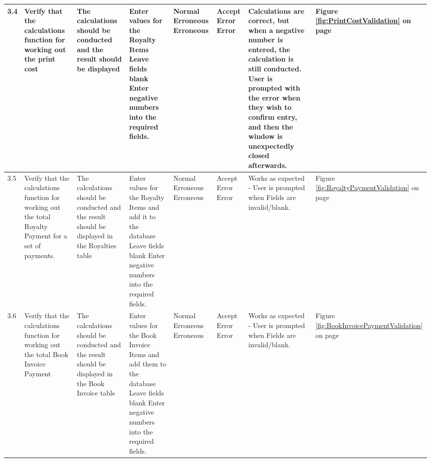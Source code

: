 \begin{landscape}
\begin{center}
\begin{longtable}{|p{1.5cm}|p{2cm}|p{2.5cm}|p{2.5cm}|p{2cm}|p{2cm}|p{2cm}|p{2cm}|}
\rowcolor{lightgray} 3.4 & Verify that the calculations function for working out the print cost & The calculations should be conducted and the result should be displayed & Enter values for the Royalty Items \newline Leave fields blank \newline Enter negative numbers into the required fields. & Normal \newline Erroneous \newline Erroneous & Accept \newline Error \newline Error & Calculations are correct, but when a negative number is entered, the calculation is still conducted. User is prompted with the error when they wish to confirm entry, and then the window is unexpectedly closed afterwards. & Figure \ref{fig:PrintCostValidation} on page \pageref{fig:PrintCostValidation} \\ \hline
\rowcolor{lightgray} 3.5 & Verify that the calculations function for working out the total Royalty Payment for a set of payments. & The calculations should be conducted and the result should be displayed in the Royalties table & Enter values for the Royalty Items and add it to the database \newline Leave fields blank \newline Enter negative numbers into the required fields. & Normal \newline Erroneous \newline Erroneous & Accept \newline Error \newline Error & Works as expected - User is prompted when Fields are invalid/blank. & Figure \ref{fig:RoyaltyPaymentValidation} on page \pageref{fig:RoyaltyPaymentValidation} \\ \hline
\rowcolor{lightgray} 3.6 & Verify that the calculations function for working out the total Book Invoice Payment & The calculations should be conducted and the result should be displayed in the Book Invoice table & Enter values for the Book Invoice Items and add them to the database \newline Leave fields blank \newline Enter negative numbers into the required fields. & Normal \newline Erroneous \newline Erroneous & Accept \newline Error \newline Error & Works as expected - User is prompted when Fields are invalid/blank. & Figure \ref{fig:BookInvoicePaymentValidation} on page \pageref{fig:BookInvoicePaymentValidation} \\ \hline 

\end{longtable}
\end{center}
\end{landscape}
